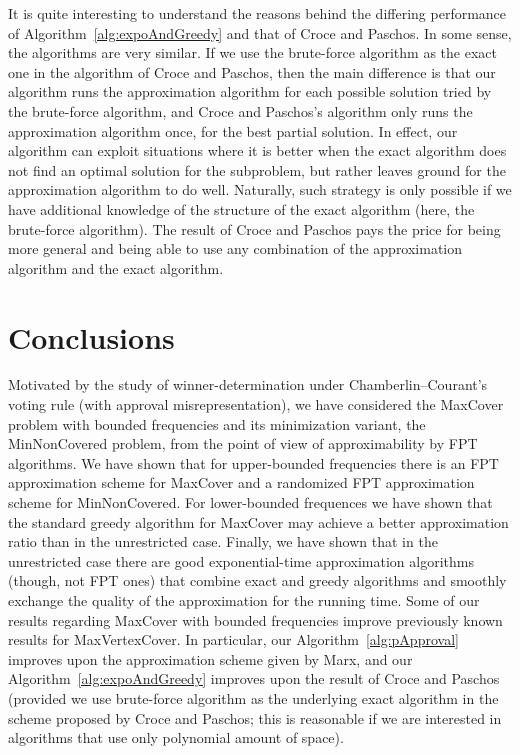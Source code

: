 \documentclass[11pt]{article}
\begin{document}
It is quite interesting to understand the reasons behind the differing
performance of Algorithm~\ref{alg:expoAndGreedy} and that of Croce and
Paschos. In some sense, the algorithms are very similar. If we use the
brute-force algorithm as the exact one in the algorithm of Croce and
Paschos, then the main difference is that our algorithm runs the
approximation algorithm for each possible solution tried by the
brute-force algorithm, and Croce and Paschos's algorithm only runs the
approximation algorithm once, for the best partial solution. In
effect, our algorithm can exploit situations where it is better when
the exact algorithm does not find an optimal solution for the
subproblem, but rather leaves ground for the approximation algorithm
to do well. Naturally, such strategy is only possible if we have
additional knowledge of the structure of the exact algorithm (here,
the brute-force algorithm). The result of Croce and Paschos pays the
price for being more general and being able to use any combination of
the approximation algorithm and the exact algorithm.


\section{Conclusions}

Motivated by the study of winner-determination under
Chamberlin--Courant's voting rule (with approval misrepresentation),
we have considered the MaxCover problem with bounded frequencies and
its minimization variant, the MinNonCovered problem, from the point of
view of approximability by FPT algorithms. We have shown that for
upper-bounded frequencies there is an FPT approximation scheme for
MaxCover and a randomized FPT approximation scheme for
MinNonCovered. For lower-bounded frequences we have shown that the
standard greedy algorithm for MaxCover may achieve a better
approximation ratio than in the unrestricted case. Finally, we have
shown that in the unrestricted case there are good exponential-time
approximation algorithms (though, not FPT ones) that combine exact and
greedy algorithms and smoothly exchange the quality of the
approximation for the running time.
Some of our results regarding MaxCover with bounded frequencies
improve previously known results for MaxVertexCover. In particular,
our Algorithm~\ref{alg:pApproval} improves upon the approximation
scheme given by Marx, and our Algorithm~\ref{alg:expoAndGreedy}
improves upon the result of Croce and Paschos~\cite{cro-pas:j:cover}
(provided we use brute-force algorithm as the underlying exact
algorithm in the scheme proposed by Croce and Paschos; this is
reasonable if we are interested in algorithms that use only polynomial
amount of space).
\end{document}
